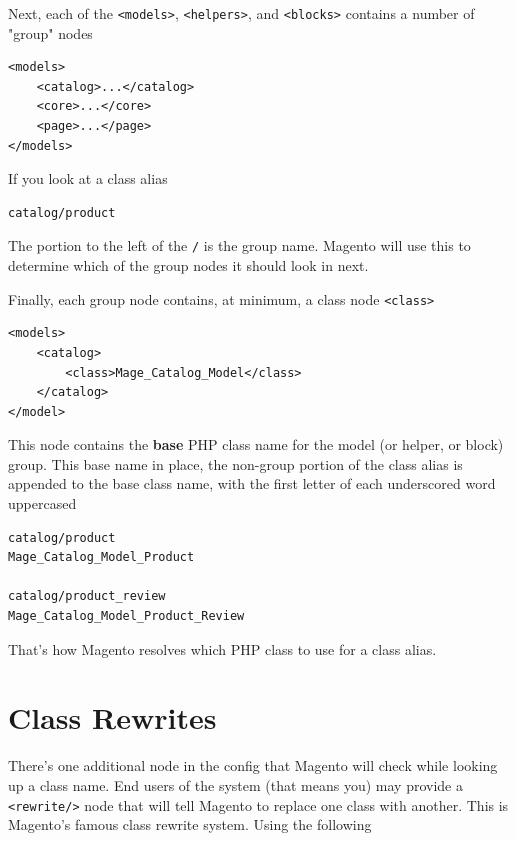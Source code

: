 \documentclass[oneside]{book}
\begin{document}
Next, each of the \footnotesize\texttt{\textless models\textgreater }\normalsize, \footnotesize\texttt{\textless helpers\textgreater }\normalsize, and \footnotesize\texttt{\textless blocks\textgreater } \normalsize  contains a number of "group" nodes

\begin{lstlisting}
<models>
    <catalog>...</catalog>
    <core>...</core>
    <page>...</page>
</models>

\end{lstlisting}


If you look at a class alias

\begin{lstlisting}
catalog/product

\end{lstlisting}


The portion to the left of the \footnotesize\texttt{/} \normalsize  is the group name. Magento will use this to determine which of the group nodes it should look in next.

Finally, each group node contains, at minimum, a class node \footnotesize\texttt{\textless class\textgreater } \normalsize

\begin{lstlisting}
<models>
    <catalog>
        <class>Mage_Catalog_Model</class>
    </catalog>
</model>

\end{lstlisting}


This node contains the \textbf{base} PHP class name for the model (or helper, or block) group.  This base name in place, the non-group portion of the class alias is appended to the base class name, with the first letter of each underscored word uppercased

\begin{lstlisting}
catalog/product
Mage_Catalog_Model_Product

catalog/product_review
Mage_Catalog_Model_Product_Review

\end{lstlisting}


That's how Magento resolves which PHP class to use for a class alias.

\section{Class Rewrites}

There's one additional node in the config that Magento will check while looking up a class name.  End users of the system (that means you) may provide a \footnotesize\texttt{\textless rewrite/\textgreater } \normalsize  node that will tell Magento to replace one class with another.  This is Magento's famous class rewrite system.  Using the following
\end{document}
